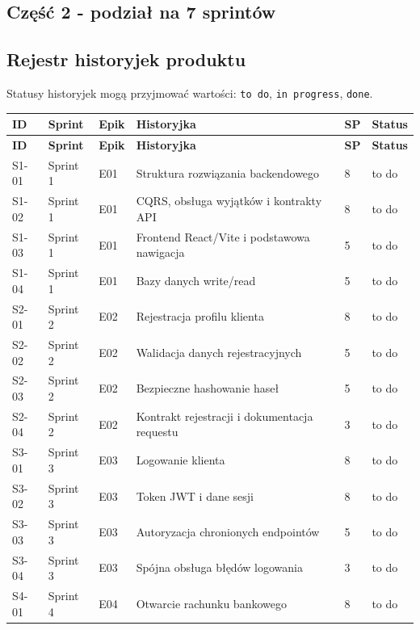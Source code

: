 \documentclass[12pt,a4paper]{article}
\begin{document}
\subsection*{Część 2 - podział na 7 sprintów}

\subsection*{Rejestr historyjek produktu}

Statusy historyjek mogą przyjmować wartości: \texttt{to do}, \texttt{in progress}, \texttt{done}.

\begingroup
\footnotesize
{}
\begin{longtable}{@{}L{0.08\textwidth}L{0.12\textwidth}L{0.10\textwidth}L{0.42\textwidth}C{0.06\textwidth}L{0.12\textwidth}@{}}
\toprule
{}
\textbf{ID} & \textbf{Sprint} & \textbf{Epik} & \textbf{Historyjka} & \textbf{SP} & \textbf{Status} \\
\midrule
\endfirsthead
\toprule
{}
\textbf{ID} & \textbf{Sprint} & \textbf{Epik} & \textbf{Historyjka} & \textbf{SP} & \textbf{Status} \\
\midrule
\endhead
S1-01 & Sprint 1 & E01 & Struktura rozwiązania backendowego & 8 & to do \\
S1-02 & Sprint 1 & E01 & CQRS, obsługa wyjątków i kontrakty API & 8 & to do \\
S1-03 & Sprint 1 & E01 & Frontend React/Vite i podstawowa nawigacja & 5 & to do \\
S1-04 & Sprint 1 & E01 & Bazy danych write/read & 5 & to do \\
S2-01 & Sprint 2 & E02 & Rejestracja profilu klienta & 8 & to do \\
S2-02 & Sprint 2 & E02 & Walidacja danych rejestracyjnych & 5 & to do \\
S2-03 & Sprint 2 & E02 & Bezpieczne hashowanie haseł & 5 & to do \\
S2-04 & Sprint 2 & E02 & Kontrakt rejestracji i dokumentacja requestu & 3 & to do \\
S3-01 & Sprint 3 & E03 & Logowanie klienta & 8 & to do \\
S3-02 & Sprint 3 & E03 & Token JWT i dane sesji & 8 & to do \\
S3-03 & Sprint 3 & E03 & Autoryzacja chronionych endpointów & 5 & to do \\
S3-04 & Sprint 3 & E03 & Spójna obsługa błędów logowania & 3 & to do \\
S4-01 & Sprint 4 & E04 & Otwarcie rachunku bankowego & 8 & to do \\

\end{longtable}
\end{document}
